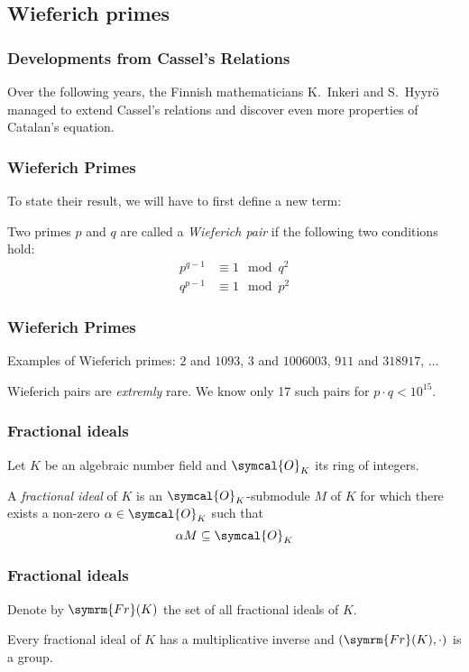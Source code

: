 \subsection{Wieferich primes}

\begin{frame}
\frametitle{Developments from Cassel's Relations}

Over the following years, the Finnish mathematicians K.\ Inkeri and S.\ Hyyrö managed to extend Cassel's relations and discover even more properties of Catalan's equation.
\end{frame}

\begin{frame}
\frametitle{Wieferich Primes}

To state their result, we will have to first define a new term:
\begin{definition}
Two primes \(p\) and \(q\) are called a \emph{Wieferich pair} if the following two conditions hold:
\begin{align*}
    p^{q - 1} &\equiv 1 \mod{q^2} \\
    q^{p - 1} &\equiv 1 \mod{p^2}
\end{align*}
\end{definition}
\end{frame}

\begin{frame}
\frametitle{Wieferich Primes}

Examples of Wieferich primes: \(2\) and \(1093\), \(3\) and \(1006003\), \(911\) and \(318917\), \(\dots\)

\begin{remark}
Wieferich pairs are \emph{extremly} rare. We know only 17 such pairs for \(p \cdot q < 10^{15}\).
\end{remark}
\end{frame}

\begin{frame}
\frametitle{Fractional ideals}

Let \(K\) be an algebraic number field and \(\symcal{O}_K\) its ring of integers.

\begin{definition}
A \emph{fractional ideal} of \(K\) is an \(\symcal{O}_K\)-submodule \(M\) of \(K\) for which there exists a non-zero \(\alpha \in \symcal{O}_K\) such that
\[
    \alpha M \subseteq \symcal{O}_K
\]
\end{definition}
\end{frame}

\begin{frame}
\frametitle{Fractional ideals}

\begin{definition}
Denote by \(\symrm{Fr}(K)\) the set of all fractional ideals of \(K\).
\end{definition}

\begin{theorem}
Every fractional ideal of \(K\) has a multiplicative inverse and \(\left(\symrm{Fr}(K), \cdot\right)\) is a group.
\end{theorem}
\end{frame}

